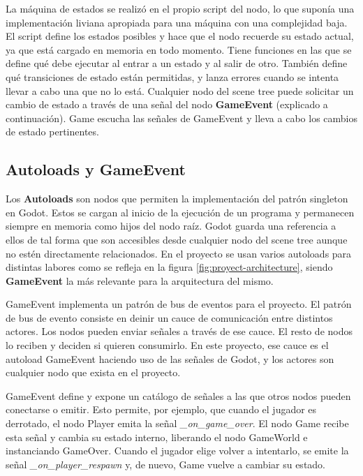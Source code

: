 La máquina de estados se realizó en el propio script del nodo, lo que suponía una implementación liviana apropiada para una máquina con una complejidad baja. El script define los estados posibles y hace que el nodo recuerde su estado actual, ya que está cargado en memoria en todo momento. Tiene funciones en las que se define qué debe ejecutar al entrar a un estado y al salir de otro. También define qué transiciones de estado están permitidas, y lanza errores cuando se intenta llevar a cabo una que no lo está. Cualquier nodo del scene tree puede solicitar un cambio de estado a través de una señal del nodo \textbf{GameEvent} (explicado a continuación). Game escucha las señales de GameEvent y lleva a cabo los cambios de estado pertinentes.

\subsection{Autoloads y GameEvent}

Los \textbf{Autoloads} son nodos que permiten la implementación del patrón singleton en Godot. Estos se cargan al inicio de la ejecución de un programa y permanecen siempre en memoria como hijos del nodo raíz. Godot guarda una referencia a ellos de tal forma que son accesibles desde cualquier nodo del scene tree aunque no estén directamente relacionados. En el proyecto se usan varios autoloads para distintas labores como se refleja en la figura \ref{fig:proyect-architecture}, siendo \textbf{GameEvent} la más relevante para la arquitectura del mismo.

GameEvent implementa un patrón de bus de eventos para el proyecto. El patrón de bus de evento consiste en deinir un cauce de comunicación entre distintos actores. Los nodos pueden enviar señales a través de ese cauce. El resto de nodos lo reciben y deciden si quieren consumirlo. En este proyecto, ese cauce es el autoload GameEvent haciendo uso de las señales de Godot, y los actores son cualquier nodo que exista en el proyecto.

GameEvent define y expone un catálogo de señales a las que otros nodos pueden conectarse o emitir. Esto permite, por ejemplo, que cuando el jugador es derrotado, el nodo Player emita la señal \textit{\_on\_game\_over}. El nodo Game recibe esta señal y cambia su estado interno, liberando el nodo GameWorld e instanciando GameOver. Cuando el jugador elige volver a intentarlo, se emite la señal \textit{\_on\_player\_respawn} y, de nuevo, Game vuelve a cambiar su estado.

